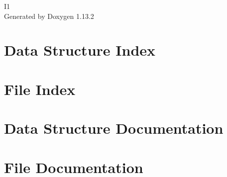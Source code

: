 \documentclass[twoside]{book}
\newcommand{\+}{\discretionary{\mbox{\scriptsize$\hookleftarrow$}}{}{}}
\newcommand{\clearemptydoublepage}{%
    \newpage{\pagestyle{empty}\cleardoublepage}%
  }
\begin{document}
  \raggedbottom
    \hypersetup{pageanchor=false,
                bookmarksnumbered=true,
                pdfencoding=unicode
               }
  \begin{titlepage}
  \vspace*{7cm}
  \begin{center}%
  {\Large I1}\\
  \vspace*{1cm}
  {\large Generated by Doxygen 1.13.2}\\
  \end{center}
  \end{titlepage}
  \clearemptydoublepage
  \tableofcontents
  \clearemptydoublepage
  \hypersetup{pageanchor=true}
\chapter{Data Structure Index}

\chapter{File Index}

\chapter{Data Structure Documentation}






\chapter{File Documentation}






















  \backmatter
  \newpage
  \clearemptydoublepage
  \printindex
\end{document}
